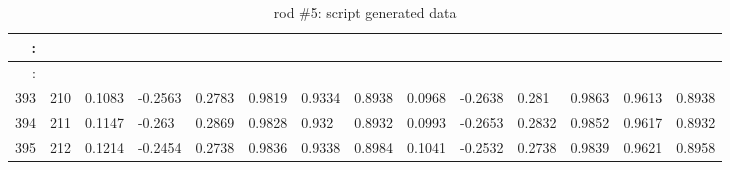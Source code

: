 \begin{table}[p]
{\begin{minipage}{\textheight}
\begin{tabular}{rr||lll|lll||lll|lll}
 :      &      &         &         &        &        &        &        &         &         &        &        &        &        \\
 \hline
 :      &      &         &         &        &        &        &        &         &         &        &        &        &        \\
 393    & 210  & 0.1083  & -0.2563 & 0.2783 & 0.9819 & 0.9334 & 0.8938 & 0.0968  & -0.2638 & 0.281  & 0.9863 & 0.9613 & 0.8938 \\
 394    & 211  & 0.1147  & -0.263  & 0.2869 & 0.9828 & 0.932  & 0.8932 & 0.0993  & -0.2653 & 0.2832 & 0.9852 & 0.9617 & 0.8932 \\
 395    & 212  & 0.1214  & -0.2454 & 0.2738 & 0.9836 & 0.9338 & 0.8984 & 0.1041  & -0.2532 & 0.2738 & 0.9839 & 0.9621 & 0.8958
 \end{tabular}
        \caption{rod \#5: script generated data}
        \label{tab:spit-out-5}
      \end{minipage}
    }
  \end{table}
 


